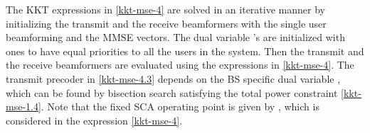 The \ac{KKT} expressions in \eqref{kkt-mse-4} are solved in an iterative manner by initializing the transmit and the receive beamformers  with the single user beamforming and the \ac{MMSE} vectors. The dual variable \me{\alpha}'s are initialized with ones to have equal priorities to all the users in the system. Then the transmit and the receive beamformers are evaluated using the expressions in \eqref{kkt-mse-4}. The transmit precoder in \eqref{kkt-mse-4.3} depends on the \ac{BS} specific dual variable , which can be found by bisection search satisfying the total power constraint \eqref{kkt-mse-1.4}. Note that the fixed \ac{SCA} operating point is given by , which is considered in the expression \eqref{kkt-mse-4}.

